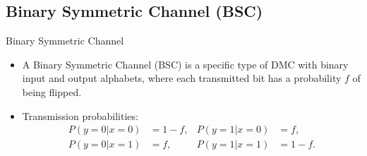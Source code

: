 \subsection{Binary Symmetric Channel (BSC)}
\begin{marginfigure}
    \centering
    \caption{Binary Symmetric Channel}
\end{marginfigure}

\begin{itemize}
    \item A Binary Symmetric Channel (BSC) is a specific type of DMC with binary input and output alphabets, where each transmitted bit has a probability \( f \) of being flipped.
    \item Transmission probabilities:
          \begin{align*}
              P(y = 0 | x = 0) & = 1 - f, & P(y = 1 | x = 0) & = f,     \\
              P(y = 0 | x = 1) & = f,     & P(y = 1 | x = 1) & = 1 - f.
          \end{align*}
\end{itemize}

